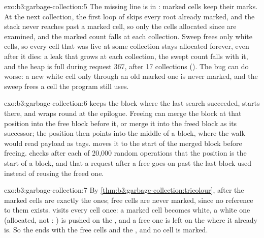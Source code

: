 \begin{solution}{exo:b3:garbage-collection:5}
The missing line is  in : marked cells keep their marks. At the next collection, the first loop of  skips every root already marked, and the stack never reaches past a marked cell, so only the cells allocated since are examined, and the marked count falls at each collection. Sweep frees only white cells, so every cell that was live at some collection stays allocated forever, even after it dies: a leak that grows at each collection, the swept count falls with it, and the heap is full during request 367, after 17 collections (). The bug can do worse: a new white cell  only through an old marked one is never marked, and the sweep frees a cell the program still uses.
\end{solution}

\begin{solution}{exo:b3:garbage-collection:6}
 keeps the block where the last search succeeded, starts there, and wraps round at the epilogue. Freeing can merge the block at that position into the free block before it, or merge it into the freed block as its successor; the position then points into the middle of a block, where the walk would read payload as tags.  moves it to the start of the merged block before freeing.  checks after each of 20,000 random operations that the position is the start of a block, and that a request after a free goes on past the last block used instead of reusing the freed one.
\end{solution}

\begin{solution}{exo:b3:garbage-collection:7}
By \cref{thm:b3:garbage-collection:tricolour}, after  the marked cells are exactly the  ones; free cells are never marked, since no reference to them exists.  visits every cell once: a marked cell becomes white, a white one (allocated, not : ) is pushed on the , and a free one is left on the  where it already is. So the  ends with the free cells and the , and no cell is marked.
\end{solution}

